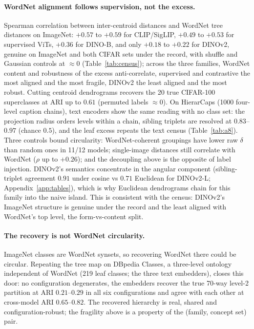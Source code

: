 \paragraph{WordNet alignment follows supervision, not the excess.} Spearman correlation between inter-centroid distances and WordNet tree distances on ImageNet: $+0.57$ to $+0.59$ for CLIP/SigLIP, $+0.49$ to $+0.53$ for supervised ViTs, $+0.36$ for DINO-B, and only $+0.18$ to $+0.22$ for DINOv2, genuine on ImageNet and both CIFAR sets under the record, with shuffle and Gaussian controls at $\approx0$ (Table~\ref{tab:census}); across the three families, WordNet content and robustness of the excess anti-correlate, supervised and contrastive the most aligned and the most fragile, DINOv2 the least aligned and the most robust. %
Cutting centroid dendrograms recovers the 20 true CIFAR-100 superclasses at ARI up to $0.61$ (permuted labels $\approx0$). %
On HierarCaps \citep{alper2024hierarcaps} (1000 four-level caption chains), text encoders show the same reading with no class set: the projection radius orders levels within a chain, sibling triplets are resolved at $0.83$--$0.97$ (chance $0.5$), and the leaf excess repeats the text census (Table~\ref{tab:a8}). %
Three controls bound circularity: WordNet-coherent groupings have lower raw $\delta$ than random ones in 11/12 models; single-image distances still correlate with WordNet ($\rho$ up to $+0.26$); and the decoupling above is the opposite of label injection. %
DINOv2's semantics concentrate in the angular component (sibling-triplet agreement $0.91$ under cosine vs $0.71$ Euclidean for DINOv2-L; Appendix~\ref{app:tables}), which is why Euclidean dendrograms chain for this family into the naive island. This is consistent with the census: DINOv2's ImageNet structure is genuine under the record and the least aligned with WordNet's top level, the form-vs-content split. %

\paragraph{The recovery is not WordNet circularity.} ImageNet classes are WordNet synsets, so recovering WordNet there could be circular. Repeating the tree map on DBpedia Classes, a three-level ontology independent of WordNet (219 leaf classes; the three text embedders), closes this door: no configuration degenerates, the embedders recover the true 70-way level-2 partition at ARI $0.21$--$0.29$ in all six configurations and agree with each other at cross-model ARI $0.65$--$0.82$. The recovered hierarchy is real, shared and configuration-robust; the fragility above is a property of the (family, concept set) pair. %

